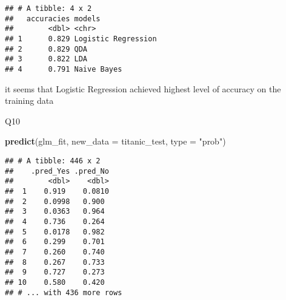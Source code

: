 \documentclass[]{article}
\newenvironment{Shaded}{\begin{snugshade}}{\end{snugshade}}
\newcommand{\DataTypeTok}[1]{\textcolor[rgb]{0.13,0.29,0.53}{#1}}
\newcommand{\KeywordTok}[1]{\textcolor[rgb]{0.13,0.29,0.53}{\textbf{#1}}}
\newcommand{\NormalTok}[1]{#1}
\newcommand{\OperatorTok}[1]{\textcolor[rgb]{0.81,0.36,0.00}{\textbf{#1}}}
\newcommand{\StringTok}[1]{\textcolor[rgb]{0.31,0.60,0.02}{#1}}
\begin{document}
\begin{Shaded}
\end{Shaded}

\begin{verbatim}
## # A tibble: 4 x 2
##   accuracies models             
##        <dbl> <chr>              
## 1      0.829 Logistic Regression
## 2      0.829 QDA                
## 3      0.822 LDA                
## 4      0.791 Naive Bayes
\end{verbatim}

it seems that Logistic Regression achieved highest level of accuracy on
the training data

Q10

\begin{Shaded}
\begin{Highlighting}[]
\KeywordTok{predict}\NormalTok{(glm_fit, }\DataTypeTok{new_data =}\NormalTok{ titanic_test, }\DataTypeTok{type =} \StringTok{"prob"}\NormalTok{)}
\end{Highlighting}
\end{Shaded}

\begin{verbatim}
## # A tibble: 446 x 2
##    .pred_Yes .pred_No
##        <dbl>    <dbl>
##  1    0.919    0.0810
##  2    0.0998   0.900 
##  3    0.0363   0.964 
##  4    0.736    0.264 
##  5    0.0178   0.982 
##  6    0.299    0.701 
##  7    0.260    0.740 
##  8    0.267    0.733 
##  9    0.727    0.273 
## 10    0.580    0.420 
## # ... with 436 more rows
\end{verbatim}

\begin{Shaded}
\end{Shaded}
\end{document}
